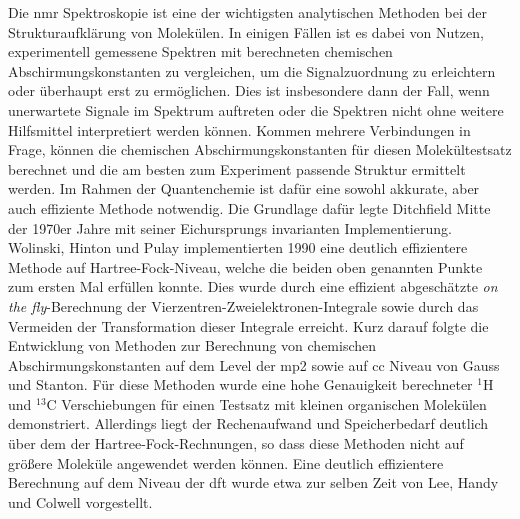 Die \ac{nmr} Spektroskopie ist eine der wichtigsten analytischen Methoden bei der Strukturaufklärung von Molekülen. In einigen Fällen ist es dabei von Nutzen, experimentell gemessene Spektren mit berechneten chemischen Abschirmungskonstanten zu vergleichen, um die Signalzuordnung zu erleichtern oder überhaupt erst zu ermöglichen. Dies ist insbesondere dann der Fall, wenn unerwartete Signale im Spektrum auftreten oder die Spektren nicht ohne weitere Hilfsmittel interpretiert werden können. Kommen mehrere Verbindungen in Frage, können die chemischen Abschirmungskonstanten für diesen Molekültestsatz berechnet und die am besten zum Experiment passende Struktur ermittelt werden. Im Rahmen der Quantenchemie ist dafür eine sowohl akkurate, aber auch effiziente Methode notwendig. Die Grundlage dafür legte Ditchfield\supercite{ditchfield1974self} Mitte der 1970er Jahre mit seiner Eichursprungs invarianten Implementierung. Wolinski, Hinton und Pulay\supercite{wolinski1990efficient} implementierten 1990 eine deutlich effizientere Methode auf Hartree-Fock-Niveau, welche die beiden oben genannten Punkte zum ersten Mal erfüllen konnte. Dies wurde durch eine effizient abgeschätzte \glqq \textit{on the fly}\grqq{}-Berechnung der Vierzentren-Zweielektronen-Integrale sowie durch das Vermeiden der Transformation dieser Integrale erreicht. Kurz darauf folgte die Entwicklung von Methoden zur Berechnung von chemischen Abschirmungskonstanten auf dem Level der \ac{mp2}\supercite{gauss1992calculation} sowie auf \ac{cc}\supercite{gauss1995gauge} Niveau von Gauss und Stanton. Für diese Methoden wurde eine hohe Genauigkeit berechneter $^1$H und $^{13}$C Verschiebungen für einen Testsatz mit kleinen organischen Molekülen demonstriert. Allerdings liegt der Rechenaufwand und Speicherbedarf deutlich über dem der Hartree-Fock-Rechnungen, so dass diese Methoden nicht auf größere Moleküle angewendet werden können. Eine deutlich effizientere Berechnung auf dem Niveau der \ac{dft} wurde etwa zur selben Zeit von Lee, Handy und Colwell\supercite{lee1995density} vorgestellt. 

